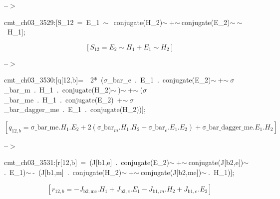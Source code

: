 \documentclass[fleqn]{article}
\begin{document}
\noindent
\begin{minipage}[t]{4.000000em}\color{red}\bfseries
 --\ensuremath{\ensuremath{>}}	
\end{minipage}
\begin{minipage}[t]{\textwidth}\color{blue}
cmt\_ch03\_3529:[S\_12\ =\ E\_1\ \ensuremath{\sim\ }\ conjugate(H\_2)\ensuremath{\sim\ }+\ensuremath{\sim\ }conjugate(E\_2)\ensuremath{\sim\ }\ensuremath{\sim\ }\ H\_1];
\end{minipage}
\[\displaystyle \tag{cmt\_ ch03\_ 3529} 
\left[ {S_{\ensuremath{\mathrm{12}}}}={E_2}\operatorname{\sim  }{H_1}+{E_1}\operatorname{\sim  }{H_2}\right] \mbox{}
\]


\noindent
\begin{minipage}[t]{4.000000em}\color{red}\bfseries
 --\ensuremath{\ensuremath{>}}	
\end{minipage}
\begin{minipage}[t]{\textwidth}\color{blue}
cmt\_ch03\_3530:[q[12,b]=\ \ 2*\ (\ensuremath{\sigma}\_bar\_e\ .\ E\_1\ .\ conjugate(E\_2)\ensuremath{\sim\ }+\ensuremath{\sim\ }\ensuremath{\sigma}\_bar\_m\ .\ H\_1\ .\ conjugate(H\_2)\ensuremath{\sim\ })\ensuremath{\sim\ }+\ensuremath{\sim\ }(\ensuremath{\sigma}\_bar\_me\ .\ H\_1\ .\ conjugate(E\_2)\ +\ensuremath{\sim\ }\ensuremath{\sigma}\_bar\_dagger\_me\ .\ E\_1\ .\ conjugate(H\_2))];
\end{minipage}
\[\displaystyle \tag{cmt\_ ch03\_ 3530} 
\left[ {q_{12,b}}=\ensuremath{\mathrm{\sigma \_ bar\_ me}}\ensuremath{\mathrm{ . }}{H_1}\ensuremath{\mathrm{ . }}{E_2}+2 \left( {{\ensuremath{\mathrm{\sigma \_ bar}}}_m}\ensuremath{\mathrm{ . }}{H_1}\ensuremath{\mathrm{ . }}{H_2}+{{\ensuremath{\mathrm{\sigma \_ bar}}}_e}\ensuremath{\mathrm{ . }}{E_1}\ensuremath{\mathrm{ . }}{E_2}\right) +\ensuremath{\mathrm{\sigma \_ bar\_ dagger\_ me}}\ensuremath{\mathrm{ . }}{E_1}\ensuremath{\mathrm{ . }}{H_2}\right] \mbox{}
\]


\noindent
\begin{minipage}[t]{4.000000em}\color{red}\bfseries
 --\ensuremath{\ensuremath{>}}	
\end{minipage}
\begin{minipage}[t]{\textwidth}\color{blue}
cmt\_ch03\_3531:[r[12,b]\ =\ (J[b1,e]\ .\ conjugate(E\_2)\ensuremath{\sim\ }+\ensuremath{\sim\ }conjugate(J[b2,e])\ensuremath{\sim\ }.\ E\_1)\ensuremath{\sim\ }-\ (J[b1,m]\ .\ conjugate(H\_2)\ensuremath{\sim\ }+\ensuremath{\sim\ }conjugate(J[b2,me])\ensuremath{\sim\ }.\ H\_1)];
\end{minipage}
\[\displaystyle \tag{cmt\_ ch03\_ 3531} 
\left[ {r_{12,b}}=-{J_{\ensuremath{\mathrm{b2}},\ensuremath{\mathrm{me}}}}\ensuremath{\mathrm{ . }}{H_1}+{J_{\ensuremath{\mathrm{b2}},e}}\ensuremath{\mathrm{ . }}{E_1}-{J_{\ensuremath{\mathrm{b1}},m}}\ensuremath{\mathrm{ . }}{H_2}+{J_{\ensuremath{\mathrm{b1}},e}}\ensuremath{\mathrm{ . }}{E_2}\right] \mbox{}
\]
\end{document}
